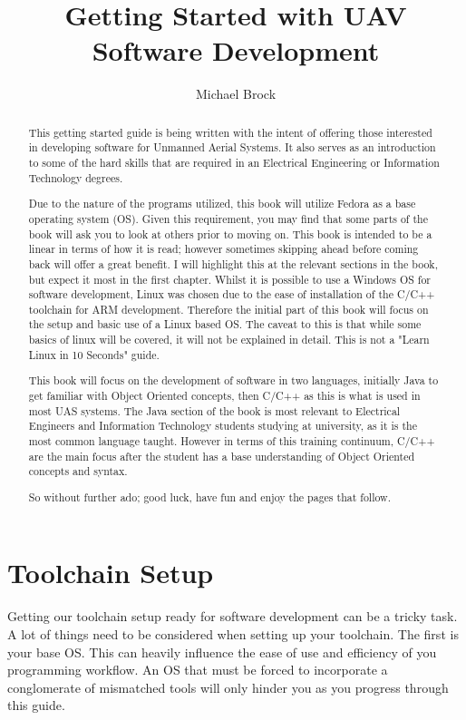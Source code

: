 \documentclass[a4paper,11pt]{report}
\author{Michael Brock}
\title{Getting Started with UAV Software Development}
\begin{document}
\maketitle
\tableofcontents
\begin{abstract}
  This getting started guide is being written with the intent of offering those interested in developing software for Unmanned Aerial Systems.
  It also serves as an introduction to some of the hard skills that are required in an Electrical Engineering or Information Technology degrees.

  Due to the nature of the programs utilized, this book will utilize Fedora as a base operating system (OS).
	Given this requirement, you may find that some parts of the book will ask you to look at others prior to moving on. This book is intended to be a linear in terms of how it is read; however sometimes skipping ahead before coming back will offer a great benefit.
	I will highlight this at the relevant sections in the book, but expect it most in the first chapter.
  Whilst it is possible to use a Windows OS for software development, Linux was chosen due to the ease of installation of the C/C++ toolchain for ARM development.
  Therefore the initial part of this book will focus on the setup and basic use of a Linux based OS. The caveat to this is that while some basics of linux will be covered, it will not be explained in detail. This is not a "Learn Linux in 10 Seconds" guide.

  This book will focus on the development of software in two languages, initially Java to get familiar with Object Oriented concepts, then C/C++ as this is what is used in most UAS systems.
  The Java section of the book is most relevant to Electrical Engineers and Information Technology students studying at university, as it is the most common language taught.
  However in terms of this training continuum, C/C++ are the main focus after the student has a base understanding of Object Oriented concepts and syntax.

  So without further ado; good luck, have fun and enjoy the pages that follow.

\end{abstract}

\chapter{Toolchain Setup}
  \label{ch:ToolchainSetup}
  Getting our toolchain setup ready for software development can be a tricky task.
  A lot of things need to be considered when setting up your toolchain. The first is your base OS.
  This can heavily influence the ease of use and efficiency of you programming workflow.
  An OS that must be forced to incorporate a conglomerate of mismatched tools will only hinder you as you progress through this guide.
\end{document}
